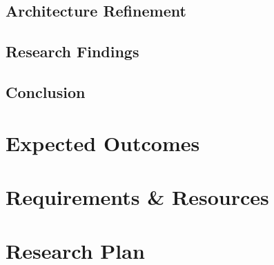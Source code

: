 \documentclass[11pt]{article}
\begin{document}
\subsection{Architecture Refinement}
\subsection{Research Findings}
\subsection{Conclusion}
\section{Expected Outcomes}
\section{Requirements \& Resources}
\section{Research Plan}



\end{document}
